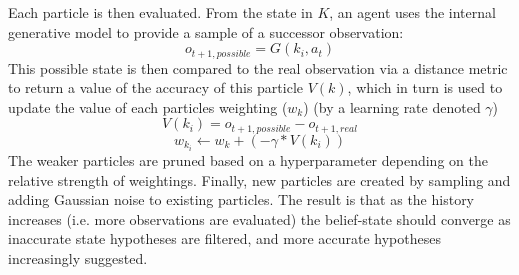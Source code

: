 \newline \newline
Each particle is then evaluated. From the state in $K$, an agent uses the internal generative model to provide a sample of a successor observation: 
\begin{equation}
    o_{t+1, possible} = G(k_i, a_t)
\end{equation}
This possible state is then compared to the real observation via a distance metric to return a value of the accuracy of this particle $V(k)$, which in turn is used to update the value of each particles weighting ($w_k$) (by a learning rate denoted $\gamma$) 
\begin{equation}
    V(k_i) = o_{t+1, possible} - o_{t+1, real}
\end{equation}
\begin{equation}
    w_{k_i} \leftarrow w_k + (- \gamma * V(k_i))
\end{equation}
The weaker particles are pruned based on a hyperparameter depending on the relative strength of weightings. Finally, new particles are created by sampling and adding Gaussian noise to existing particles. 
\newline \newline
The result is that as the history increases (i.e. more observations are evaluated) the belief-state should converge as inaccurate state hypotheses are filtered, and more accurate hypotheses increasingly suggested. 

